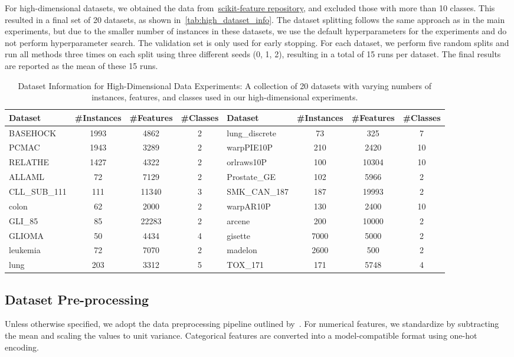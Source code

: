 For high-dimensional datasets, we obtained the data from~\href{https://jundongl.github.io/scikit-feature/datasets}{scikit-feature repository}, and excluded those with more than 10 classes. This resulted in a final set of 20 datasets, as shown in~\autoref{tab:high_dataset_info}. The dataset splitting follows the same approach as in the main experiments, but due to the smaller number of instances in these datasets, we use the default hyperparameters for the experiments and do not perform hyperparameter search. The validation set is only used for early stopping. For each dataset, we perform five random splits and run all methods three times on each split using three different seeds (0, 1, 2), resulting in a total of 15 runs per dataset. The final results are reported as the mean of these 15 runs. 

\begin{table}[ht]
\centering
\caption{Dataset Information for High-Dimensional Data Experiments: A collection of 20 datasets with varying numbers of instances, features, and classes used in our high-dimensional experiments.}
\begin{tabular}{lccc|lccc}
\toprule
\textbf{Dataset} & \textbf{\#Instances} & \textbf{\#Features} & \textbf{\#Classes} &\textbf{Dataset} & \textbf{\#Instances} & \textbf{\#Features} & \textbf{\#Classes} \\
\midrule
BASEHOCK&	1993&	4862&	2  & lung\_discrete&	73&	325&	7 \\
PCMAC	&1943	&3289	&2  & warpPIE10P&	210&	2420&	10\\
RELATHE	&1427	&4322	&2  &orlraws10P &	100&	10304&	10 \\
ALLAML	& 72	&7129	&2  & Prostate\_GE	&102&	5966&	2 \\
CLL\_SUB\_111&	111&	11340&	3 & SMK\_CAN\_187&	187&	19993&	2 \\
colon&	62&	2000&	2  & warpAR10P	&130	&2400	&10 \\
GLI\_85&	85	&22283	&2  & arcene&	200&	10000&	2\\
GLIOMA&	50	&4434&	4  & gisette	&7000&	5000&	2 \\
leukemia&	72&	7070&	2  & madelon&	2600&	500&	2 \\
lung&	203&	3312&	5 & TOX\_171&	171&	5748&	4\\
\bottomrule
\end{tabular}
\label{tab:high_dataset_info}
\end{table}

\subsection{Dataset Pre-processing}
Unless otherwise specified,  we adopt the data preprocessing pipeline outlined by~\citet{GorishniyRKB21Revisiting}. For numerical features, we standardize by subtracting the mean and scaling the values to unit variance. Categorical features are converted into a model-compatible format using one-hot encoding.

